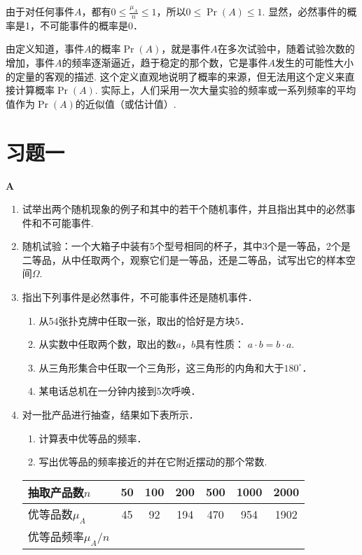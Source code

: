由于对任何事件$A$，都有$0\le \frac{\mu_A}{n}\le 1$，所以$0\le \Pr(A)\le 1$. 显然，必然事件的概率是1，不可能事件的概率是0．

由定义知道，事件$A$的概率$\Pr(A)$，就是事件$A$在多次试验中，随着试验次数的增加，事件$A$的频率逐渐逼近，趋于稳定的那个数，它是事件$A$发生的可能性大小的定量的客观的描述. 这个定义直观地说明了概率的来源，但无法用这个定义来直接计算概率$\Pr(A)$. 实际上，人们采用一次大量实验的频率或一系列频率的平均值作为$\Pr(A)$的近似值（或估计值）.


\section*{习题一}
\begin{center}
    \bfseries A
\end{center}

\begin{enumerate}
    \item 试举出两个随机现象的例子和其中的若干个随机事件，并且指出其中的必然事件和不可能事件.
    \item 随机试验：一个大箱子中装有5个型号相同的杯子，其中3个是一等品，2个是二等品，从中任取两个，观察它们是一等品，还是二等品，试写出它的样本空间$\Omega$.
    \item 指出下列事件是必然事件，不可能事件还是随机事件．
\begin{enumerate}[(1)]
\item 从54张扑克牌中任取一张，取出的恰好是方块5．
\item 从实数中任取两个数，取出的数$a$，$b$具有性质：
    $a\cdot b=b\cdot a$.
    \item 从三角形集合中任取一个三角形，这三角形的内角和大于$180^{\circ}$．
    \item 某电话总机在一分钟内接到5次呼唤． 
\end{enumerate}

    \item 对一批产品进行抽查，结果如下表所示．
\begin{enumerate}[(1)]
    \item 计算表中优等品的频率．
\item 写出优等品的频率接近的并在它附近摆动的那个常数.
\end{enumerate}

\begin{center}
\begin{tabular}{l|cccccc}
\hline
    抽取产品数$n$&50&    100&    200&    500&  1000
&    2000\\ \hline 
优等品数$\mu_A$&45&92&194&470&954&1902\\
优等品频率$\mu_A/n$\\
\hline
\end{tabular}
\end{center}

\end{enumerate}


